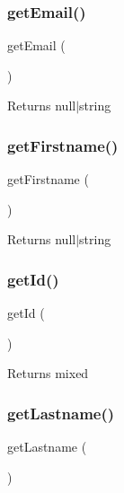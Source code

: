 \subsubsection{\texorpdfstring{getEmail()}{getEmail()}}
{\footnotesize\ttfamily get\+Email (\begin{DoxyParamCaption}{ }\end{DoxyParamCaption})}

\begin{DoxyReturn}{Returns}
null$\vert$string 
\end{DoxyReturn}
\mbox{\label{class_app_1_1_entity_1_1_user_a42c9621713b6dcdfb9edd5a7630b6d93}} 
\subsubsection{\texorpdfstring{getFirstname()}{getFirstname()}}
{\footnotesize\ttfamily get\+Firstname (\begin{DoxyParamCaption}{ }\end{DoxyParamCaption})}

\begin{DoxyReturn}{Returns}
null$\vert$string 
\end{DoxyReturn}
\mbox{\label{class_app_1_1_entity_1_1_user_a12251d0c022e9e21c137a105ff683f13}} 
\subsubsection{\texorpdfstring{getId()}{getId()}}
{\footnotesize\ttfamily get\+Id (\begin{DoxyParamCaption}{ }\end{DoxyParamCaption})}

\begin{DoxyReturn}{Returns}
mixed 
\end{DoxyReturn}
\mbox{\label{class_app_1_1_entity_1_1_user_a5d606fdf02d35b79b74b91a88c09000f}} 
\subsubsection{\texorpdfstring{getLastname()}{getLastname()}}
{\footnotesize\ttfamily get\+Lastname (\begin{DoxyParamCaption}{ }\end{DoxyParamCaption})}

